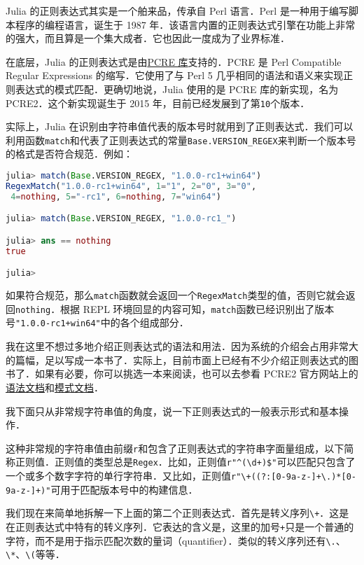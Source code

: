 Julia 的正则表达式其实是一个舶来品，传承自 Perl 语言．Perl 是一种用于编写脚本程序的编程语言，诞生于 1987 年．该语言内置的正则表达式引擎在功能上非常的强大，而且算是一个集大成者．它也因此一度成为了业界标准．

在底层，Julia 的正则表达式是由\href{https://www.pcre.org}{PCRE 库}支持的．PCRE 是 Perl Compatible Regular Expressions 的缩写．它使用了与 Perl 5 几乎相同的语法和语义来实现正则表达式的模式匹配．更确切地说，Julia 使用的是 PCRE 库的新实现，名为 PCRE2．这个新实现诞生于 2015 年，目前已经发展到了第\verb|10|个版本．

实际上，Julia 在识别由字符串值代表的版本号时就用到了正则表达式．我们可以利用函数\verb|match|和代表了正则表达式的常量\verb|Base.VERSION_REGEX|来判断一个版本号的格式是否符合规范．例如：
\begin{lstlisting}[language=julia]
julia> match(Base.VERSION_REGEX, "1.0.0-rc1+win64")
RegexMatch("1.0.0-rc1+win64", 1="1", 2="0", 3="0",
 4=nothing, 5="-rc1", 6=nothing, 7="win64")

julia> match(Base.VERSION_REGEX, "1.0.0-rc1_")

julia> ans == nothing
true

julia> 
\end{lstlisting}

如果符合规范，那么\verb|match|函数就会返回一个\verb|RegexMatch|类型的值，否则它就会返回\verb|nothing|．根据 REPL 环境回显的内容可知，\verb|match|函数已经识别出了版本号\verb|"1.0.0-rc1+win64"|中的各个组成部分．

我在这里不想过多地介绍正则表达式的语法和用法．因为系统的介绍会占用非常大的篇幅，足以写成一本书了．实际上，目前市面上已经有不少介绍正则表达式的图书了．如果有必要，你可以挑选一本来阅读，也可以去参看 PCRE2 官方网站上的\href{https://www.pcre.org/current/doc/html/pcre2syntax.html}{语法文档}和\href{https://www.pcre.org/current/doc/html/pcre2pattern.html}{模式文档}．

我下面只从非常规字符串值的角度，说一下正则表达式的一般表示形式和基本操作．

这种非常规的字符串值由前缀\verb|r|和包含了正则表达式的字符串字面量组成，以下简称正则值．正则值的类型总是\verb|Regex|．比如，正则值\verb|r"^(\d+)$"|可以匹配只包含了一个或多个数字字符的单行字符串．又比如，正则值\verb|r"\+((?:[0-9a-z-]+\.)*[0-9a-z-]+)"|可用于匹配版本号中的构建信息．

我们现在来简单地拆解一下上面的第二个正则表达式．首先是转义序列\verb|\+|．这是在正则表达式中特有的转义序列．它表达的含义是，这里的加号\verb|+|只是一个普通的字符，而不是用于指示匹配次数的量词（quantifier）．类似的转义序列还有\verb|\.|、\verb|\*|、\verb|\(|等等．


